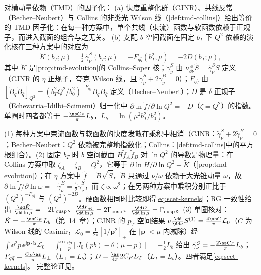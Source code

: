 \begin{proposition}\label{prop:scet-rapidity-rg}
对横动量依赖（TMD）的因子化：
(a) 快度重整化群（CJNR）、共线反常（Becher--Neubert）与 Collins 的非类光 Wilson 线（\cref{def:tmd-collins}）给出等价的 TMD 因子化\cite{Collins:2017oxh}：在每一种方案中，单个共线（束流）函数与软函数依赖于正规子，而进入截面的组合与之无关。
(b) 支配 $b$ 空间截面在固定 $b_T$ 下 $Q^2$ 依赖的演化核在三种方案中的对应为
\begin{equation}\label{eq:scet-kernels}
\tilde K(b_T;\mu)=\tfrac12\,\tilde\gamma_\nu^S(b_T;\mu)=-F_{q\bar q}(b_T^2,\mu)=-2D(b_T;\mu),
\end{equation}
其中 $\tilde K$ 是\cref{prop:tmd-evolution}的 Collins--Soper 核；$\tilde\gamma_\nu^S$ 由 $\nu\frac{\dd}{\dd\nu}\tilde S=\tilde\gamma^S_\nu\tilde S$ 定义（CJNR 的 $\eta$ 正规子，夸克 Wilson 线，且 $\tilde\gamma^S_\nu+2\tilde\gamma^B_\nu=0$）；$F_{q\bar q}$ 由 $[\tilde B_{q}\tilde B_{\bar q}]_{Q^2}=(b_T^2Q^2/b_0^2)^{-F_{q\bar q}}B_qB_{\bar q}$ 定义（Becher--Neubert）；$D$ 是 $\delta$ 正规子（Echevarria--Idilbi--Scimemi）归一化中 $\partial\ln\tilde f/\partial\ln Q^2=-D$（$\zeta=Q^2$）的指数\cite{EchevarriaIdilbiScimemi2012}。单圈时四者都等于 $-\frac{\as C_F}{\pi}L_b$，$L_b=\ln(\mu^2b_T^2/b_0^2)$。
\end{proposition}

\begin{proofsketch}
(1) 每种方案中束流函数与软函数的快度发散在乘积中相消（CJNR：$\tilde\gamma^S_\nu+2\tilde\gamma^B_\nu=0$\cite{ChiuEtAl2012b}；Becher--Neubert：$Q^2$ 依赖被完整地指数化\cite{BecherNeubert2011}；Collins：\cref{def:tmd-collins}中的平方根组合）。(2) 固定 $b_T$ 时 $b$ 空间截面 $H\tilde f_A\tilde f_B$ 对 $\ln Q^2$ 的导数是物理量：在 Collins 方案中取 $\zeta_A=\zeta_B=Q^2$，它等于 $\partial\ln H/\partial\ln Q^2+\tilde K$（\cref{prop:tmd-evolution}）；在 $\eta$ 方案中 $\tilde f=\tilde B\sqrt{\tilde S}$，$\tilde B$ 只通过 $\nu/\omega$ 依赖于大光锥动量 $\omega$，故 $\partial\ln\tilde f/\partial\ln\omega=-\tilde\gamma^B_\nu=\frac12\tilde\gamma^S_\nu$，而 $\zeta\propto\omega^2$；在另两种方案中乘积分别正比于 $(Q^2)^{-F_{q\bar q}}$ 与 $(Q^2)^{-2D}$。硬函数相同时比较即得\cref{eq:scet-kernels}；RG 一致性给出 $\frac{\dd\tilde K}{\dd\ln\mu}=-2\Gamma_{\rm cusp}$、$\frac{\dd F_{q\bar q}}{\dd\ln\mu}=2\Gamma_{\rm cusp}$、$\frac{\dd D}{\dd\ln\mu}=\Gamma_{\rm cusp}$。(3) 单圈核对：$\tilde K=-\frac{\as C_F}\pi L_b$（第~14~章）；CJNR 的 $p_T$ 空间结果 $\nu\frac{\dd}{\dd\nu}S^{(1)}=\frac{4\as C}{\pi}\mathcal L_0$（$C$ 为 Wilson 线的 Casimir，$\mathcal L_0=\frac1{2\pi}[1/\bm p^2]_+$ 在 $|\bm p|<\mu$ 内减除）\cite{ChiuEtAl2012b}经 $\int\dd^2p\,\ee^{\ii\bm p\cdot\bm b}\mathcal L_0=\int_0^\infty\frac{\dd p}p[J_0(pb)-\theta(\mu-p)]=-\frac12L_b$ 给出 $\tilde\gamma^S_\nu=-\frac{2\as C_F}{\pi}L_b$；$F_{q\bar q}=\frac{C_F\as}\pi L_\perp$（$L_\perp=L_b$）\cite{BecherNeubert2011}；$D=\frac{\as}{4\pi}2C_FL_T$（$L_T=L_b$）\cite{EchevarriaIdilbiScimemi2012}。四者满足\cref{eq:scet-kernels}。%
完整论证见\cite{Collins:2017oxh,ChiuEtAl2012b,BecherNeubert2011,EchevarriaIdilbiScimemi2012}。
\end{proofsketch}

